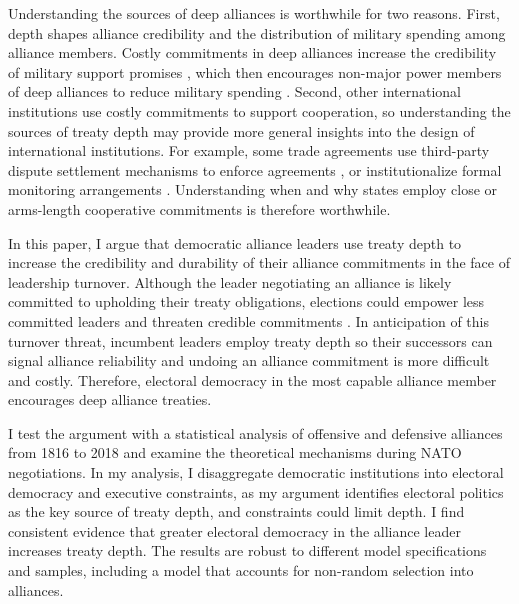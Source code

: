\documentclass[12pt]{article}
\begin{document}
Understanding the sources of deep alliances is worthwhile for two reasons.
First, depth shapes alliance credibility and the distribution of military spending among alliance members. 
Costly commitments in deep alliances increase the credibility of military support promises \citep{Morrow1994}, which then encourages non-major power members of deep alliances to reduce military spending \citep{Alley2020}.  
Second, other international institutions use costly commitments to support cooperation, so understanding the sources of treaty depth may provide more general insights into the design of international institutions.  
For example, some trade agreements use third-party dispute settlement mechanisms to enforce agreements \citep{Smith2000}, or institutionalize formal monitoring arrangements \citep{Duretal2013}.  
Understanding when and why states employ close or arms-length cooperative commitments is therefore worthwhile. 


In this paper, I argue that democratic alliance leaders use treaty depth to increase the credibility and durability of their alliance commitments in the face of leadership turnover. 
Although the leader negotiating an alliance is likely committed to upholding their treaty obligations, elections could empower less committed leaders and threaten credible commitments \citep{GartzkeGleditsch2004, LeedsSavun2007, Leedsetal2009}.
In anticipation of this turnover threat, incumbent leaders employ treaty depth so their successors can signal alliance reliability and undoing an alliance commitment is more difficult and costly. 
Therefore, electoral democracy in the most capable alliance member encourages deep alliance treaties. 


I test the argument with a statistical analysis of offensive and defensive alliances from 1816 to 2018 and examine the theoretical mechanisms during NATO negotiations.
In my analysis, I disaggregate democratic institutions into electoral democracy and executive constraints, as my argument identifies electoral politics as the key source of treaty depth, and constraints could limit depth. 
I find consistent evidence that greater electoral democracy in the alliance leader increases treaty depth. 
The results are robust to different model specifications and samples, including a model that accounts for non-random selection into alliances. 
\end{document}
